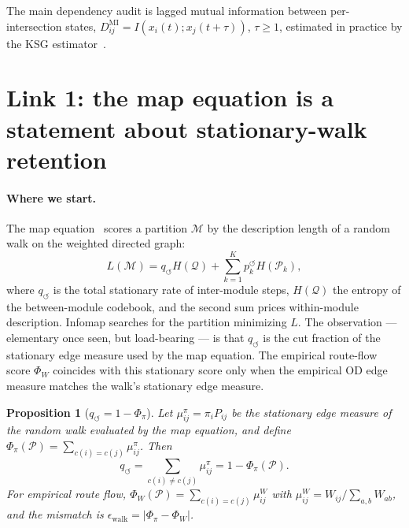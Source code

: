\documentclass[11pt]{article}
\newtheorem{proposition}[theorem]{Proposition}
\theoremstyle{definition}
\theoremstyle{remark}
\begin{document}
The main dependency audit is lagged mutual information between
per-intersection states,
$D^{\mathrm{MI}}_{ij} = I\!\left(x_i(t); x_j(t{+}\tau)\right)$, $\tau \geq 1$,
estimated in practice by the KSG estimator~\citep{kraskov2004ksg}.

\section{Link 1: the map equation is a statement about stationary-walk retention}
\label{sec:link1}

\paragraph{Where we start.}
The map equation~\citep{rosvall2008maps,rosvall2009mapequation} scores a
partition $\mathcal{M}$ by the description length of a random walk on the
weighted directed graph:
\begin{equation}
    L(\mathcal{M})
    = q_{\circlearrowleft} H(\mathcal{Q})
    + \sum_{k=1}^{K} p_k^{\circlearrowleft} H(\mathcal{P}_k),
    \label{eq:mapeq}
\end{equation}
where $q_{\circlearrowleft}$ is the total stationary rate of inter-module
steps, $H(\mathcal{Q})$ the entropy of the between-module codebook, and the
second sum prices within-module description.
Infomap searches for the partition minimizing $L$.
The observation --- elementary once seen, but load-bearing --- is that
$q_{\circlearrowleft}$ is the cut fraction of the stationary edge measure
used by the map equation.
The empirical route-flow score $\Phi_W$ coincides with this stationary score
only when the empirical OD edge measure matches the walk's stationary edge
measure.

\begin{proposition}[$q_{\circlearrowleft} = 1 - \Phi_\pi$]
    \label{prop:phi}
    Let $\mu^\pi_{ij}=\pi_iP_{ij}$ be the stationary edge measure of the
    random walk evaluated by the map equation, and define
    $\Phi_\pi(\mathcal{P})=\sum_{c(i)=c(j)}\mu^\pi_{ij}$.
    Then
    \begin{equation}
        q_{\circlearrowleft}
        = \sum_{c(i)\neq c(j)} \mu^\pi_{ij}
        = 1 - \Phi_\pi(\mathcal{P}).
    \end{equation}
    For empirical route flow,
    $\Phi_W(\mathcal{P})=\sum_{c(i)=c(j)}\mu^W_{ij}$ with
    $\mu^W_{ij}=W_{ij}/\sum_{a,b}W_{ab}$, and the mismatch is
    $\epsilon_{\mathrm{walk}}=|\Phi_\pi-\Phi_W|$.
\end{proposition}
\end{document}
